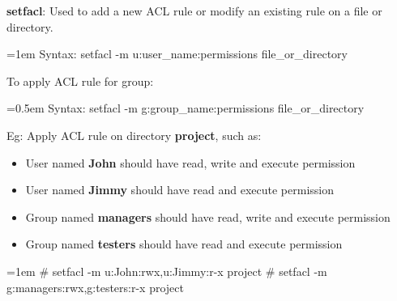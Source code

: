 \setlength{\columnsep}{3pt}
\begin{flushleft}
	\textbf{setfacl}: Used to add a new ACL rule or modify an existing rule on a file or directory.
	\bigskip
	\begin{tcolorbox}[breakable,notitle,boxrule=-0pt,colback=pink,colframe=pink]
		\color{black}
		\font=1em
		Syntax: setfacl -m u:user\_name:permissions file\_or\_directory
		\font=4pt
	\end{tcolorbox}
	
	To apply ACL rule for group:
	\begin{tcolorbox}[breakable,notitle,boxrule=-0pt,colback=pink,colframe=pink]
	\color{black}
	\font=0.5em
	Syntax: setfacl -m g:group\_name:permissions file\_or\_directory
	\font=4pt
	\end{tcolorbox}

	\item Eg: Apply ACL rule on directory \textbf{project}, such as:
	\begin{itemize}
		\item User named \textbf{John} should have read, write and execute permission
		\item User named \textbf{Jimmy} should have read and execute permission
		\item Group named \textbf{managers} should have read, write and execute permission
		\item Group named \textbf{testers} should have read and execute permission
	\end{itemize}
	\bigskip

	\begin{tcolorbox}[breakable,notitle,boxrule=-0pt,colback=black,colframe=black]
		\color{green}
		\font=1em
		\# setfacl -m u:John:rwx,u:Jimmy:r-x project
		\newline
		\# setfacl -m g:managers:rwx,g:testers:r-x project
		\font=4pt
	\end{tcolorbox}
\newpage
	

\end{flushleft}
